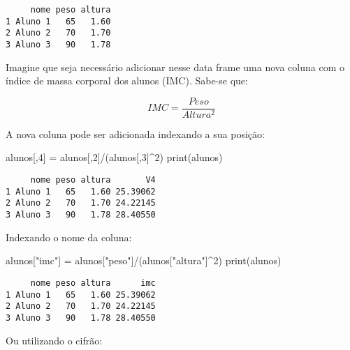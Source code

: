 \documentclass[
  letterpaper,
  DIV=11,
  numbers=noendperiod]{scrreprt}
\newenvironment{Shaded}{\begin{snugshade}}{\end{snugshade}}
\newcommand{\DecValTok}[1]{\textcolor[rgb]{0.68,0.00,0.00}{#1}}
\newcommand{\FunctionTok}[1]{\textcolor[rgb]{0.28,0.35,0.67}{#1}}
\newcommand{\NormalTok}[1]{\textcolor[rgb]{0.00,0.23,0.31}{#1}}
\newcommand{\OtherTok}[1]{\textcolor[rgb]{0.00,0.23,0.31}{#1}}
\newcommand{\SpecialCharTok}[1]{\textcolor[rgb]{0.37,0.37,0.37}{#1}}
\newcommand{\StringTok}[1]{\textcolor[rgb]{0.13,0.47,0.30}{#1}}
\begin{document}
\begin{verbatim}
     nome peso altura
1 Aluno 1   65   1.60
2 Aluno 2   70   1.70
3 Aluno 3   90   1.78
\end{verbatim}

Imagine que seja necessário adicionar nesse data frame uma nova coluna
com o índice de massa corporal dos alunos (IMC). Sabe-se que:

\[
IMC = \frac{Peso}{Altura^2}
\]

A nova coluna pode ser adicionada indexando a sua posição:

\begin{Shaded}
\begin{Highlighting}[]
\NormalTok{alunos[,}\DecValTok{4}\NormalTok{] }\OtherTok{=}\NormalTok{ alunos[,}\DecValTok{2}\NormalTok{]}\SpecialCharTok{/}\NormalTok{(alunos[,}\DecValTok{3}\NormalTok{]}\SpecialCharTok{\^{}}\DecValTok{2}\NormalTok{)}
\FunctionTok{print}\NormalTok{(alunos)}
\end{Highlighting}
\end{Shaded}

\begin{verbatim}
     nome peso altura       V4
1 Aluno 1   65   1.60 25.39062
2 Aluno 2   70   1.70 24.22145
3 Aluno 3   90   1.78 28.40550
\end{verbatim}

Indexando o nome da coluna:

\begin{Shaded}
\begin{Highlighting}[]
\NormalTok{alunos[}\StringTok{"imc"}\NormalTok{] }\OtherTok{=}\NormalTok{ alunos[}\StringTok{"peso"}\NormalTok{]}\SpecialCharTok{/}\NormalTok{(alunos[}\StringTok{"altura"}\NormalTok{]}\SpecialCharTok{\^{}}\DecValTok{2}\NormalTok{)}
\FunctionTok{print}\NormalTok{(alunos)}
\end{Highlighting}
\end{Shaded}

\begin{verbatim}
     nome peso altura      imc
1 Aluno 1   65   1.60 25.39062
2 Aluno 2   70   1.70 24.22145
3 Aluno 3   90   1.78 28.40550
\end{verbatim}

Ou utilizando o cifrão:

\begin{Shaded}
\end{Shaded}
\end{document}
